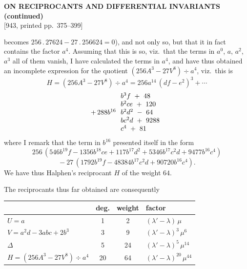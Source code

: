 \documentclass[11pt]{article}
\begin{document}
\setcounter{page}{375}

\begin{center}
{\large\bfseries ON RECIPROCANTS AND DIFFERENTIAL INVARIANTS (continued)}\\[0.4em]
{\small [943, printed pp.\ 375--399]}
\end{center}
\vspace{0.4em}

\noindent becomes $256\,.\,27624 - 27\,.\,256624 = 0$), and not only so, but that it in fact contains the factor $a^4$. Assuming that this is so, viz.\ that the terms in $a^0$, $a$, $a^2$, $a^3$ all of them vanish, I have calculated the terms in $a^4$, and have thus obtained an incomplete expression for the quotient $(256 A^3 - 27 V^8) \div a^4$, viz.\ this is
\[
H = (256 A^3 - 27 V^8) \div a^4 = 256 a^{14}\,(df - e^2)^3 + \cdots
\]
\[
\begin{array}{r@{\,}l}
+\, 288 b^{16} & \begin{array}{l} b^3 f \ +\ 48 \\ b^2 c e \ +\ 120 \\ b^2 d^2 \ -\ 64 \\ b c^2 d \ +\ 9288 \\ c^4 \ +\ 81 \end{array}
\end{array}
\]
where I remark that the term in $b^{16}$ presented itself in the form
\[
256\,(546 b^{19} f - 1356 b^{18} c e + 117 b^{17} d^2 + 5346 b^{17} c^2 d + 9477 b^{16} c^4)
\]
\[
{}- 27\,(1792 b^{19} f - 48384 b^{17} c^2 d + 90720 b^{16} c^4).
\]
We have thus Halphen's reciprocant $H$ of the weight $64$.

The reciprocants thus far obtained are consequently
\begin{center}
\begin{tabular}{lccl}
\hline
 & deg. & weight & factor \\
\hline
$U = a$ & 1 & 2 & $(\lambda' - \lambda)\,\mu$ \\
$V = a^2 d - 3 a b c + 2 b^3$ & 3 & 9 & $(\lambda' - \lambda)^3\,\mu^6$ \\
$\Delta$ & 5 & 24 & $(\lambda' - \lambda)^5\,\mu^{14}$ \\
$H = (256 A^3 - 27 V^8) \div a^4$ & 20 & 64 & $(\lambda' - \lambda)^{20}\,\mu^{44}$ \\
\hline
\end{tabular}
\end{center}
\end{document}

